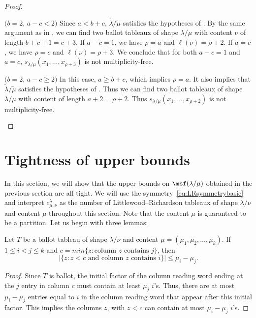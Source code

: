 \begin{proof}
\begin{Case}
{ $(b=2$, $a-c < 2)$} 
Since $a<b+c$, $\tilde\lambda/\tilde\mu$ satisfies the hypotheses of . By the same argument as in , we can find two ballot tableaux of shape $\lambda / \mu$ with content $\nu$ of length $b + c + 1 = c + 3$. If $a-c=1$, we have $\rho = a$ and $\ell(\nu) = \rho + 2$. If $a = c$, we have $\rho = c$ and $\ell(\nu) = \rho + 3$. We conclude that for both $a-c=1$ and $a=c$, $s_{\lambda/\mu}(x_1,\ldots,x_{\rho+3})$ is not multiplicity-free.
\end{Case}

\begin{Case}
{ $(b=2$, $a-c\geq 2)$} 
In this case, $a\geq b+c$, which implies $\rho = a$. It also implies that $\tilde\lambda/\tilde\mu$ satisfies the hypotheses of . Thus we can find two ballot tableaux of shape $\lambda / \mu$ with content of length $a + 2 = \rho + 2$. Thus $s_{\lambda/\mu}(x_1,\ldots,x_{\rho+2})$ is not multiplicity-free.\qedhere
\end{Case}
\end{proof}

\section{Tightness of upper bounds}

In this section, we will show that the upper bounds on $\msf (\lambda/\mu)$ obtained in the previous section are all tight. We will use the symmetry~\eqref{eq:LRsymmetrybasic} and interpret $c^{\lambda}_{\mu,\nu}$ as the number of Littlewood--Richardson tableaux of shape $\lambda/\nu$ and content $\mu$ throughout this section. Note that the content $\mu$ is guaranteed to be a partition. Let us begin with three lemmas:

\begin{lemma}\label{Lemma:basicballot}
Let $T$ be a ballot tableau of shape $\lambda/\nu$ and content $\mu = (\mu_1,\mu_2,\ldots,\mu_k)$. If $1\leq i<j\leq k$ and $c = min\{ z : \text{column $z$ contains $j$} \}$, then 
\[
|\{ z : z < c\text{ and column $z$ contains $i$} \}| \leq \mu_i-\mu_j.
\]
 \end{lemma}
\begin{proof}
Since $T$ is ballot, the initial factor of the column reading word ending at the $j$ entry in column $c$ must contain at least $\mu_j$ $i$'s. Thus, there are at most $\mu_i-\mu_j$ entries equal to $i$ in the column reading word that appear after this initial factor. This implies the columns $z$, with $z < c$ can contain at most $\mu_i-\mu_j$ $i$'s.
\end{proof}

